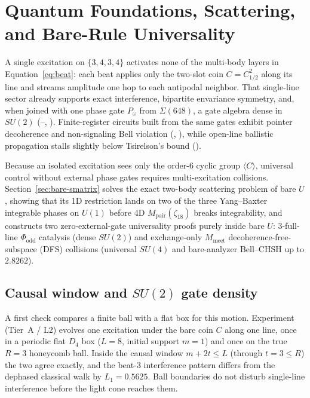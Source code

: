 \section{Quantum Foundations, Scattering, and Bare-Rule Universality}
\label{sec:quantum}

A single excitation on $\{3,4,3,4\}$ activates none of the multi-body layers in Equation~\eqref{eq:beat}: each beat
applies only the two-slot coin $C = C_{1/2}^2$ along its line and streams amplitude one hop to each antipodal neighbor.
That single-line sector already supports exact interference, bipartite envariance symmetry, and, when joined with one
phase gate $P_\omega$ from $\Sigma(648)$, a gate algebra dense in $SU(2)$ (--,
). Finite-register circuits built from the same gates exhibit pointer decoherence and non-signaling
Bell violation (, ), while open-line ballistic propagation stalls slightly below
Tsirelson's bound ().

Because an isolated excitation sees only the order-6 cyclic group $\langle C \rangle$, universal control without
external phase gates requires multi-excitation collisions. Section~\ref{sec:bare-smatrix} solves the exact two-body
scattering problem of bare $U$, showing that its 1D restriction lands on two of the three Yang--Baxter integrable
phases on $U(1)$ before 4D $M_{\mathrm{pair}}(\zeta_{18})$ breaks integrability, and constructs two zero-external-gate
universality proofs purely inside bare $U$: 3-full-line $\Phi_{\mathrm{odd}}$ catalysis (dense $SU(2)$) and
exchange-only $M_{\mathrm{meet}}$ decoherence-free-subspace (DFS) collisions (universal $SU(4)$ and bare-analyzer
Bell--CHSH up to $2.8262$).

\subsection{Causal window and \texorpdfstring{$SU(2)$}{SU(2)} gate density}

A first check compares a finite ball with a flat box for this motion. Experiment 
(Tier~A / L2) evolves one excitation under the bare coin $C$ along one line, once in a periodic flat $D_4$ box
($L = 8$, initial support $m = 1$) and once on the true $R = 3$ honeycomb ball. Inside the causal window
$m + 2t \le L$ (through $t = 3 \le R$) the two agree exactly, and the beat-3 interference pattern differs from the
dephased classical walk by $L_1 = 0.5625$. Ball boundaries do not disturb single-line interference before the light
cone reaches them.

